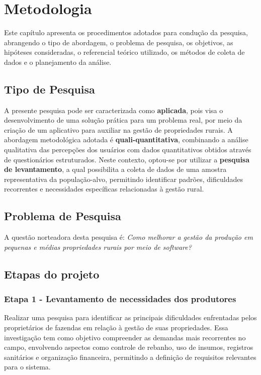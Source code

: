 \chapter{Metodologia}
\label{cap:metodologia}

Este capítulo apresenta os procedimentos adotados para condução da pesquisa, abrangendo o tipo de abordagem, o problema de pesquisa, os objetivos, as hipóteses consideradas, o referencial teórico utilizado, os métodos de coleta de dados e o planejamento da análise.

\section{Tipo de Pesquisa}

A presente pesquisa pode ser caracterizada como \textbf{aplicada}, pois visa o desenvolvimento de uma solução prática para um problema real, por meio da criação de um aplicativo para auxiliar na gestão de propriedades rurais. A abordagem metodológica adotada é \textbf{quali-quantitativa}, combinando a análise qualitativa das percepções dos usuários com dados quantitativos obtidos através de questionários estruturados. Neste contexto, optou-se por utilizar a \textbf{pesquisa de levantamento}, a qual possibilita a coleta de dados de uma amostra representativa da população-alvo, permitindo identificar padrões, dificuldades recorrentes e necessidades específicas relacionadas à gestão rural.

\section{Problema de Pesquisa}

A questão norteadora desta pesquisa é: \textit{Como melhorar a gestão da produção em pequenas e médias propriedades rurais por meio de software?}

\section{Etapas do projeto}

\subsection{Etapa 1 - Levantamento de necessidades dos produtores}

Realizar uma pesquisa para identificar as principais dificuldades enfrentadas pelos proprietários de fazendas em relação à gestão de suas propriedades. Essa investigação tem como objetivo compreender as demandas mais recorrentes no campo, envolvendo aspectos como controle de rebanho, uso de insumos, registros sanitários e organização financeira, permitindo a definição de requisitos relevantes para o sistema.

